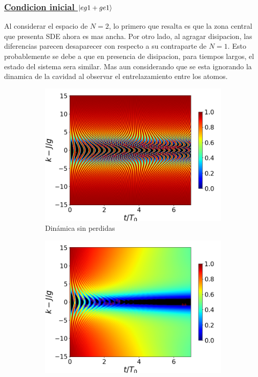 \subsubsection{\underline{Condicion inicial $\ket{eg1+ge1}$}}
Al considerar el espacio de $N=2$, lo primero que resalta es que la zona central que presenta SDE ahora es mas ancha. Por otro lado, al agragar disipacion, las diferencias parecen desaparecer con respecto a su contraparte de $N=1$. Esto probablemente se debe a que en presencia de disipacion, para tiempos largos, el estado del sistema sera similar. Mas aun considerando que se esta ignorando la dinamica de la cavidad al observar el entrelazamiento entre los atomos.
\begin{figure}[h!]
    \centering
    \begin{subfigure}{0.49\textwidth}
        \includegraphics[width=\textwidth]{figuras/ch4/concu/k/eg1+ge1 d=0.0g x=0.0g J=15.0g gamma=0.25g concu k uni.png}
        \caption{Dinámica sin perdidas}
        \label{fig4:concu k 1 uni}
    \end{subfigure}
    \hfill
    \begin{subfigure}{0.49\textwidth}
        \includegraphics[width=\textwidth]{figuras/ch4/concu/k/eg1+ge1 d=0.0g x=0.0g J=15.0g gamma=0.25g concu k dis.png}

\end{subfigure}
\end{figure}
